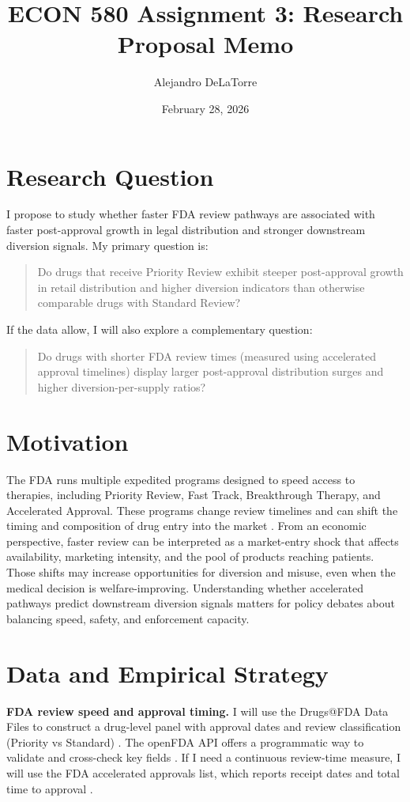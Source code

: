 \documentclass[11pt]{article}
\title{ECON 580 Assignment 3: Research Proposal Memo}
\author{Alejandro DeLaTorre}
\date{February 28, 2026}
\begin{document}
\maketitle
\onehalfspacing

\section*{Research Question}
I propose to study whether faster FDA review pathways are associated with faster post-approval growth in legal distribution and stronger downstream diversion signals. My primary question is:

\begin{quote}
Do drugs that receive Priority Review exhibit steeper post-approval growth in retail distribution and higher diversion indicators than otherwise comparable drugs with Standard Review?
\end{quote}

If the data allow, I will also explore a complementary question:

\begin{quote}
Do drugs with shorter FDA review times (measured using accelerated approval timelines) display larger post-approval distribution surges and higher diversion-per-supply ratios?
\end{quote}

\section*{Motivation}
The FDA runs multiple expedited programs designed to speed access to therapies, including Priority Review, Fast Track, Breakthrough Therapy, and Accelerated Approval. These programs change review timelines and can shift the timing and composition of drug entry into the market \parencite{FDA2023ExpeditedProgramsOverview,FDA2018PriorityReview}. From an economic perspective, faster review can be interpreted as a market-entry shock that affects availability, marketing intensity, and the pool of products reaching patients. Those shifts may increase opportunities for diversion and misuse, even when the medical decision is welfare-improving. Understanding whether accelerated pathways predict downstream diversion signals matters for policy debates about balancing speed, safety, and enforcement capacity.

\section*{Data and Empirical Strategy}
\textbf{FDA review speed and approval timing.} I will use the Drugs@FDA Data Files to construct a drug-level panel with approval dates and review classification (Priority vs Standard) \parencite{FDA2026DrugsAtFDADataFiles}. The openFDA API offers a programmatic way to validate and cross-check key fields \parencite{FDA2026openFDADrugsAtFDAEndpoint}. If I need a continuous review-time measure, I will use the FDA accelerated approvals list, which reports receipt dates and total time to approval \parencite{FDA2025AcceleratedApprovalsSurrogate}.
\end{document}
